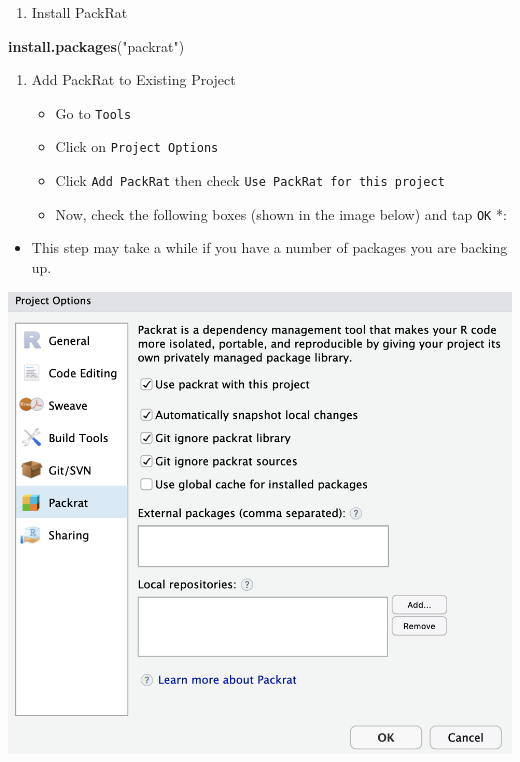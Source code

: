 \documentclass[openany]{book}
\newenvironment{Shaded}{\begin{snugshade}}{\end{snugshade}}
\newcommand{\KeywordTok}[1]{\textcolor[rgb]{0.13,0.29,0.53}{\textbf{#1}}}
\newcommand{\NormalTok}[1]{#1}
\newcommand{\StringTok}[1]{\textcolor[rgb]{0.31,0.60,0.02}{#1}}
\providecommand{\tightlist}{%
  \setlength{\itemsep}{0pt}\setlength{\parskip}{0pt}}
\begin{document}
\begin{enumerate}
\def\labelenumi{\arabic{enumi}.}
\tightlist
\item
  Install PackRat
\end{enumerate}

\begin{Shaded}
\begin{Highlighting}[]
\KeywordTok{install.packages}\NormalTok{(}\StringTok{"packrat"}\NormalTok{)}
\end{Highlighting}
\end{Shaded}

\begin{enumerate}
\def\labelenumi{\arabic{enumi}.}
\setcounter{enumi}{1}
\item
  Add PackRat to Existing Project

  \begin{itemize}
  \tightlist
  \item
    Go to \texttt{Tools}
  \item
    Click on \texttt{Project\ Options}
  \item
    Click \texttt{Add\ PackRat} then check \texttt{Use\ PackRat\ for\ this\ project}
  \item
    Now, check the following boxes (shown in the image below) and tap \texttt{OK} *:
  \end{itemize}
\end{enumerate}

\begin{itemize}
\tightlist
\item
  This step may take a while if you have a number of packages you are backing up.
\end{itemize}

\begin{center}\includegraphics[width=0.6\linewidth]{images/Workflow_Photos/packRat} \end{center}
\end{document}
